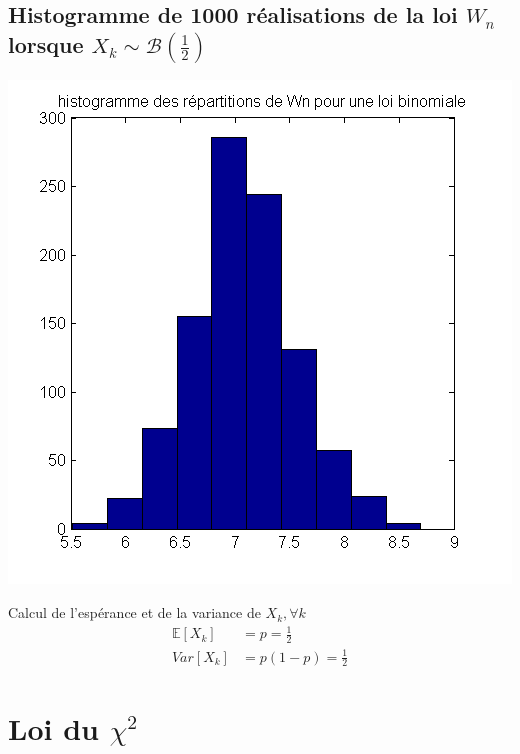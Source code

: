 \documentclass{report}
\begin{document}
		\subsection{Histogramme de 1000 réalisations de la loi $W_n$ lorsque $X_k \sim \mathcal{B}(\frac{1}{2}) $}
			\begin{center}
				\includegraphics[scale=0.7]{sources/Q242-2.png}
			\end{center}
		Calcul de l'espérance et de la variance de $X_k, \forall k$
		\begin{align*}
			\mathbb{E}[X_k] &= p = \frac{1}{2}\\
			Var[X_k] &= p(1-p) = \frac{1}{2}
		\end{align*}
		
	\section{Loi du $\chi^2$}
\end{document}
